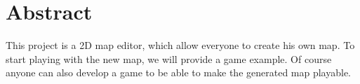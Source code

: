 \newpage
\thispagestyle{empty}

\chapter*{Abstract}

This project is a 2D map editor, which allow everyone to create his own map. To start playing with the new map, we will provide a game example. Of course anyone can also develop a game to be able to make the generated map playable.
